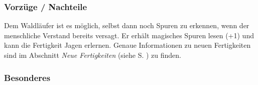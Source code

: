 \subsubsection{Vorzüge / Nachteile}
\par Dem Waldläufer ist es möglich, selbst dann noch Spuren zu erkennen, wenn der menschliche Verstand bereits 
versagt. Er erhält magisches Spuren lesen (+1) und kann die Fertigkeit Jagen erlernen. Genaue Informationen zu 
neuen Fertigkeiten sind im Abschnitt \textit{Neue Fertigkeiten} (siehe S. \pageref{neuefertigkeiten}) zu finden.
\subsubsection{Besonderes}
